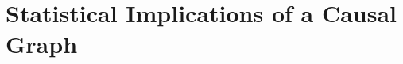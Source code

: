 \documentclass[12pt, block=fill]{beamer}
\newcommand{\paul}[1]{\textcolor{red}{#1}}
\begin{document}






\section{Statistical Implications of a Causal Graph}
\end{document}
